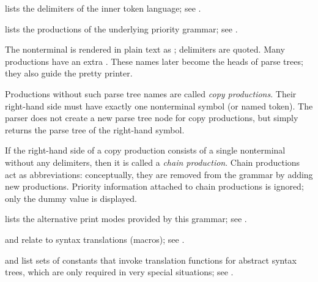 \begin{isabellebody}
\begin{isamarkuptext}
\begin{description}
  \begin{description}

  \item {} lists the delimiters of the inner token
  language; see .

  \item {} lists the productions of the underlying
  priority grammar; see .

  The nonterminal  is rendered in plain text as ; delimiters are quoted.  Many productions have an extra
  .  These names later become the heads of parse
  trees; they also guide the pretty printer.

  Productions without such parse tree names are called \emph{copy
  productions}.  Their right-hand side must have exactly one
  nonterminal symbol (or named token).  The parser does not create a
  new parse tree node for copy productions, but simply returns the
  parse tree of the right-hand symbol.

  If the right-hand side of a copy production consists of a single
  nonterminal without any delimiters, then it is called a \emph{chain
  production}.  Chain productions act as abbreviations: conceptually,
  they are removed from the grammar by adding new productions.
  Priority information attached to chain productions is ignored; only
  the dummy value  is displayed.

  \item {} lists the alternative print modes
  provided by this grammar; see .

  \item {} and  relate to
  syntax translations (macros); see .

  \item {} and  list sets of constants that invoke
  translation functions for abstract syntax trees, which are only
  required in very special situations; see .


\end{description}
\end{description}
\end{isamarkuptext}
\end{isabellebody}
